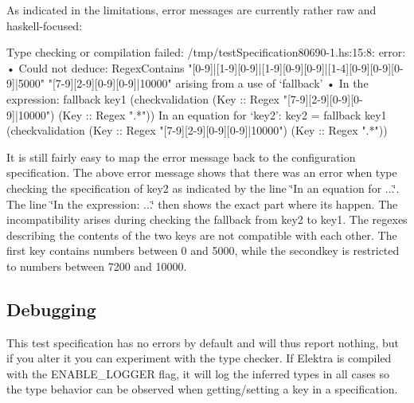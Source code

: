 

As indicated in the limitations, error messages are currently rather raw and haskell-\/focused\+:


\begin{DoxyCode}
Type checking or compilation failed:
 /tmp/testSpecification80690-1.hs:15:8: error:
     • Could not deduce: RegexContains
                           "[0-9]|[1-9][0-9]|[1-9][0-9][0-9]|[1-4][0-9][0-9][0-9]|5000"
                           "[7-9][2-9][0-9][0-9]|10000"
         arising from a use of ‘fallback’
     • In the expression:
         fallback
           key1
           (checkvalidation
              (Key :: Regex "[7-9][2-9][0-9][0-9]|10000") (Key :: Regex ".*"))
       In an equation for ‘key2’:
           key2
             = fallback
                 key1
                 (checkvalidation
                    (Key :: Regex "[7-9][2-9][0-9][0-9]|10000") (Key :: Regex ".*"))
\end{DoxyCode}


It is still fairly easy to map the error message back to the configuration specification. The above error message shows that there was an error when type checking the specification of {\ttfamily key2} as indicated by the line \char`\"{}\+In an equation for ...\char`\"{}. The line \char`\"{}\+In the expression\+: ...\char`\"{} then shows the exact part where its happen. The incompatibility arises during checking the fallback from {\ttfamily key2} to {\ttfamily key1}. The regexes describing the contents of the two keys are not compatible with each other. The first key contains numbers between 0 and 5000, while the secondkey is restricted to numbers between 7200 and 10000.

\subsection*{Debugging}

This test specification has no errors by default and will thus report nothing, but if you alter it you can experiment with the type checker. If Elektra is compiled with the E\+N\+A\+B\+L\+E\+\_\+\+L\+O\+G\+G\+ER flag, it will log the inferred types in all cases so the type behavior can be observed when getting/setting a key in a specification.


